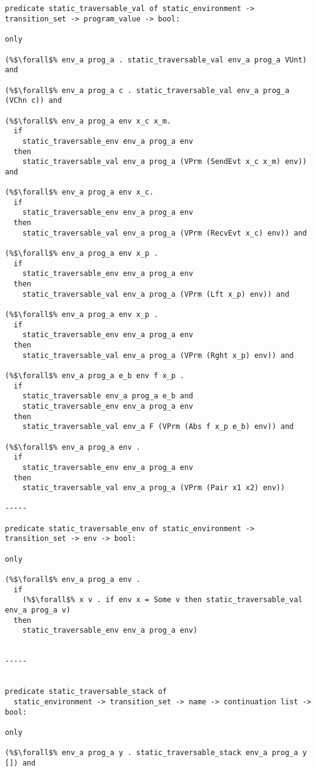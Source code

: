 \documentclass{article}
\begin{document}
\begin{lstlisting}[language=logic, escapechar=\%]


predicate static_traversable_val of static_environment -> transition_set -> program_value -> bool:

only

(%$\forall$% env_a prog_a . static_traversable_val env_a prog_a VUnt) and 

(%$\forall$% env_a prog_a c . static_traversable_val env_a prog_a (VChn c)) and

(%$\forall$% env_a prog_a env x_c x_m.
  if
    static_traversable_env env_a prog_a env 
  then 
    static_traversable_val env_a prog_a (VPrm (SendEvt x_c x_m) env)) and

(%$\forall$% env_a prog_a env x_c.
  if
    static_traversable_env env_a prog_a env 
  then
    static_traversable_val env_a prog_a (VPrm (RecvEvt x_c) env)) and

(%$\forall$% env_a prog_a env x_p .
  if
    static_traversable_env env_a prog_a env 
  then
    static_traversable_val env_a prog_a (VPrm (Lft x_p) env)) and

(%$\forall$% env_a prog_a env x_p .
  if
    static_traversable_env env_a prog_a env
  then
    static_traversable_val env_a prog_a (VPrm (Rght x_p) env)) and

(%$\forall$% env_a prog_a e_b env f x_p .
  if
    static_traversable env_a prog_a e_b and 
    static_traversable_env env_a prog_a env
  then
    static_traversable_val env_a F (VPrm (Abs f x_p e_b) env)) and

(%$\forall$% env_a prog_a env . 
  if
    static_traversable_env env_a prog_a env
  then
    static_traversable_val env_a prog_a (VPrm (Pair x1 x2) env))

-----

predicate static_traversable_env of static_environment -> transition_set -> env -> bool: 

only 

(%$\forall$% env_a prog_a env .
  if
    (%$\forall$% x v . if env x = Some v then static_traversable_val env_a prog_a v)
  then
    static_traversable_env env_a prog_a env) 


-----


predicate static_traversable_stack of
  static_environment -> transition_set -> name -> continuation list -> bool:

only

(%$\forall$% env_a prog_a y . static_traversable_stack env_a prog_a y []) and


\end{lstlisting}
\end{document}
